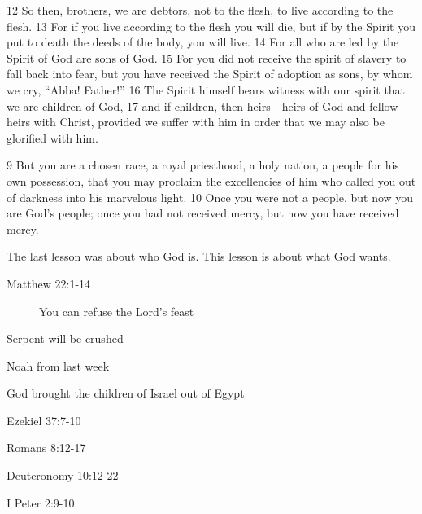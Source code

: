 \begin{bible}

12 So then, brothers, we are debtors, not to the flesh, to live according to the flesh. 13 For if you live according to the flesh you will die, but if by the Spirit you put to death the deeds of the body, you will live. 14 For all who are led by the Spirit of God are sons of God. 15 For you did not receive the spirit of slavery to fall back into fear, but you have received the Spirit of adoption as sons, by whom we cry, ``Abba! Father!'' 16 The Spirit himself bears witness with our spirit that we are children of God, 17 and if children, then heirs—heirs of God and fellow heirs with Christ, provided we suffer with him in order that we may also be glorified with him.


9 But you are a chosen race, a royal priesthood, a holy nation, a people for his own possession, that you may proclaim the excellencies of him who called you out of darkness into his marvelous light. 10 Once you were not a people, but now you are God's people; once you had not received mercy, but now you have received mercy.

\end{bible}

\begin{discussion}
The last lesson was about who God is.  This lesson is about what God wants.


\begin{description}

\item[Matthew 22:1-14]  You can refuse the Lord's feast

\end{description}


Serpent will be crushed

Noah from last week

God brought the children of Israel out of Egypt

Ezekiel 37:7-10

Romans 8:12-17


Deuteronomy 10:12-22

I Peter 2:9-10

\end{discussion}